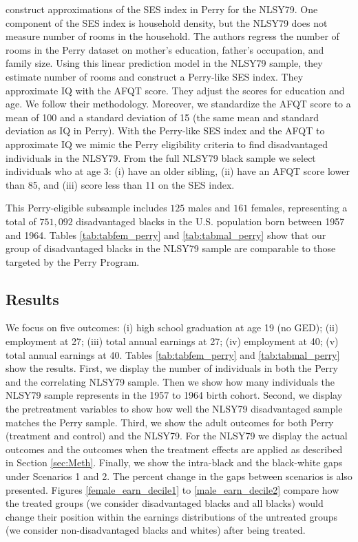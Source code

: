 \citet{heckman2010analyzing} construct approximations of the SES index in Perry for the NLSY79. One component of the SES index is household density, but the NLSY79 does not measure number of rooms in the household. The authors regress the number of rooms in the Perry dataset on mother's education, father's occupation, and family size. Using this linear prediction model in the NLSY79 sample, they estimate number of rooms and construct a Perry-like SES index. They approximate IQ with the AFQT score. They adjust the scores for education and age. We follow their methodology. Moreover, we standardize the AFQT score to a mean of 100 and a standard deviation of 15 (the same mean and standard deviation as IQ in Perry). With the Perry-like SES index and the AFQT to approximate IQ we mimic the Perry eligibility criteria to find disadvantaged individuals in the NLSY79. From the full NLSY79 black sample we select individuals who at age 3: (i) have an older sibling, (ii) have an AFQT score lower than 85, and (iii) score less than 11 on the SES index.

This Perry-eligible subsample includes $125$ males and $161$ females, representing a total of $751,092$ disadvantaged blacks in the U.S. population born between 1957 and 1964.  Tables \ref{tab:tabfem_perry} and \ref{tab:tabmal_perry} show that our group of disadvantaged blacks in the NLSY79 sample are comparable to those targeted by the Perry Program.

\subsection{Results}
We focus on five outcomes: (i) high school graduation at age 19 (no GED); (ii) employment at 27; (iii) total annual earnings at 27; (iv) employment at 40; (v) total annual earnings at 40. Tables \ref{tab:tabfem_perry} and \ref{tab:tabmal_perry} show the results. First, we display the number of individuals in both the Perry and the correlating NLSY79 sample. Then we show how many individuals the NLSY79 sample represents in the 1957 to 1964 birth cohort. Second, we display the pretreatment variables to show how well the NLSY79 disadvantaged sample matches the Perry sample. Third, we show the adult outcomes for both Perry (treatment and control) and the NLSY79. For the NLSY79 we display the actual outcomes and the outcomes when the treatment effects are applied as described in Section \ref{sec:Meth}. Finally, we show the intra-black and the black-white gaps under Scenarios 1 and 2. The percent change in the gaps between scenarios is also presented. Figures \ref{female_earn_decile1} to \ref{male_earn_decile2} compare how the treated groups (we consider disadvantaged blacks and all blacks) would  change their position within the earnings distributions of the untreated groups (we consider non-disadvantaged blacks and whites) after being treated.


